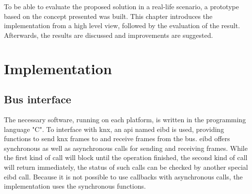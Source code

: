 \label{chap6}
To be able to evaluate the proposed solution in a real-life scenario, a prototype based on the concept presented was built. This chapter introduces the implementation from a high level
view, followed by the evaluation of the result. Afterwards, the results are discussed and improvements are suggested.
\section{Implementation}
\subsection{Bus interface}
The necessary software, running on each platform, is written in the programming language "C". To interface with \gls{knx}, an \gls{api} named \gls{eibd} is used, providing functions to
send \gls{knx} frames to and receive frames from the bus. \gls{eibd} offers synchronous as well as asynchronous calls for sending and receiving frames. While the first kind of
call will block until the operation finished, the second kind of call will return immediately, the status of such calls can be checked by another special \gls{eibd} call.
Because it is not possible to use callbacks with asynchronous calls, the implementation uses the synchronous functions.

